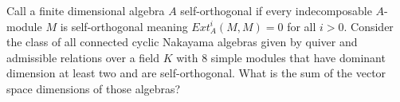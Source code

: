 Call a finite dimensional algebra $A$ self-orthogonal if every indecomposable $A$-module $M$ is self-orthogonal meaning $Ext_A^i(M,M)=0$ for all $i>0$. Consider the class of all connected cyclic Nakayama algebras given by quiver and admissible relations over a field $K$ with 8 simple modules that have dominant dimension at least two and are self-orthogonal. What is the sum of the vector space dimensions of those algebras?
